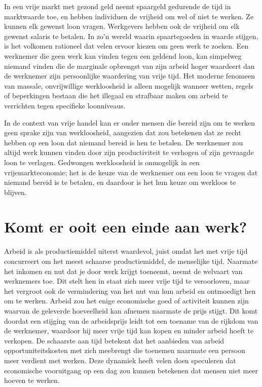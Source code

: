 \documentclass[
  a5paper,
  smalldemyvopaper,11pt,twoside,onecolumn,openright,extrafontsizes,
hidelinks]{memoir}
\begin{document}
In een vrije markt met gezond geld neemt spaargeld gedurende de tijd in
marktwaarde toe, en hebben individuen de vrijheid om wel of niet te
werken. Ze kunnen elk gewenst loon vragen. Werkgevers hebben ook de
vrijheid om elk gewenst salaris te betalen. In zo'n wereld waarin
spaartegoeden in waarde stijgen, is het volkomen rationeel dat velen
ervoor kiezen om geen werk te zoeken. Een werknemer die geen werk kan
vinden tegen een geldend loon, kan simpelweg niemand vinden die de
marginale opbrengst van zijn arbeid hoger waardeert dan de werknemer
zijn persoonlijke waardering van vrije tijd. Het moderne fenomeen van
massale, onvrijwillige werkloosheid is alleen mogelijk wanneer wetten,
regels of beperkingen bestaan die het illegaal en strafbaar maken om
arbeid te verrichten tegen specifieke loonniveaus.

In de context van vrije handel kan er onder mensen die bereid zijn om te
werken geen sprake zijn van werkloosheid, aangezien dat zou betekenen
dat ze recht hebben op een loon dat niemand bereid is hen te betalen. De
werknemer zou altijd werk kunnen vinden door zijn productiviteit te
verhogen of zijn gevraagde loon te verlagen. Gedwongen werkloosheid is
onmogelijk in een vrijemarkteconomie; het is de keuze van de werknemer
om een loon te vragen dat niemand bereid is te betalen, en daardoor is
het hun keuze om werkloos te blijven.

\section{Komt er ooit een einde aan
werk?}\label{komt-er-ooit-een-einde-aan-werk}

Arbeid is als productiemiddel uiterst waardevol, juist omdat het met
vrije tijd concurreert om het meest schaarse productiemiddel, de
menselijke tijd. Naarmate het inkomen en nut dat je door werk krijgt
toeneemt, neemt de welvaart van werknemers toe. Dit stelt hen in staat
zich meer vrije tijd te veroorloven, maar het vergroot ook de
vermindering van het nut van hun arbeid en ontmoedigt hen om te werken.
Arbeid zou het enige economische goed of activiteit kunnen zijn waarvan
de geleverde hoeveelheid kan afnemen naarmate de prijs stijgt. Dit komt
doordat een stijging van de arbeidsprijs leidt tot een toename van de
rijkdom van de werknemer, waardoor hij meer vrije tijd kan kopen en
minder arbeid hoeft te verkopen. De schaarste aan tijd betekent dat het
aanbieden van arbeid opportuniteitskosten met zich meebrengt die
toenemen naarmate een persoon meer verdient met werken. Deze dynamiek
heeft velen doen speculeren dat economische vooruitgang op een dag zou
kunnen betekenen dat mensen niet meer hoeven te werken.
\end{document}
